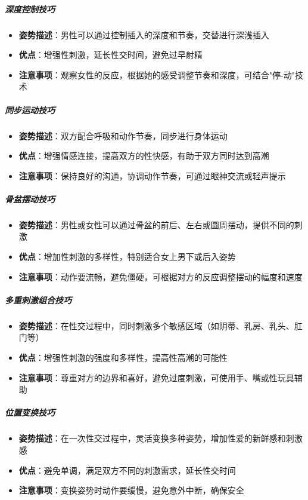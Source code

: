 \documentclass[12pt,UTF8]{ctexbook}
\begin{document}
\subparagraph{深度控制技巧}
\begin{itemize}
\item \textbf{姿势描述}：男性可以通过控制插入的深度和节奏，交替进行深浅插入
\item \textbf{优点}：增强性刺激，延长性交时间，避免过早射精
\item \textbf{注意事项}：观察女性的反应，根据她的感受调整节奏和深度，可结合"停-动"技术
\end{itemize}

\subparagraph{同步运动技巧}
\begin{itemize}
\item \textbf{姿势描述}：双方配合呼吸和动作节奏，同步进行身体运动
\item \textbf{优点}：增强情感连接，提高双方的性快感，有助于双方同时达到高潮
\item \textbf{注意事项}：保持良好的沟通，协调动作节奏，可通过眼神交流或轻声提示
\end{itemize}

\subparagraph{骨盆摆动技巧}
\begin{itemize}
\item \textbf{姿势描述}：男性或女性可以通过骨盆的前后、左右或圆周摆动，提供不同的刺激
\item \textbf{优点}：增加性刺激的多样性，特别适合女上男下或后入姿势
\item \textbf{注意事项}：动作要流畅，避免僵硬，可根据对方的反应调整摆动的幅度和速度
\end{itemize}

\subparagraph{多重刺激组合技巧}
\begin{itemize}
\item \textbf{姿势描述}：在性交过程中，同时刺激多个敏感区域（如阴蒂、乳房、乳头、肛门等）
\item \textbf{优点}：增强性刺激的强度和多样性，提高性高潮的可能性
\item \textbf{注意事项}：尊重对方的边界和喜好，避免过度刺激，可使用手、嘴或性玩具辅助
\end{itemize}

\subparagraph{位置变换技巧}
\begin{itemize}
\item \textbf{姿势描述}：在一次性交过程中，灵活变换多种姿势，增加性爱的新鲜感和刺激感
\item \textbf{优点}：避免单调，满足双方不同的刺激需求，延长性交时间
\item \textbf{注意事项}：变换姿势时动作要缓慢，避免意外中断，确保安全
\end{itemize}
\end{document}
